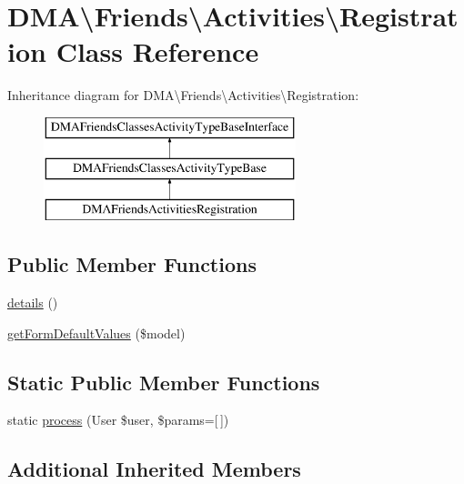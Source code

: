 \hypertarget{classDMA_1_1Friends_1_1Activities_1_1Registration}{}\section{D\+M\+A\textbackslash{}Friends\textbackslash{}Activities\textbackslash{}Registration Class Reference}
\label{classDMA_1_1Friends_1_1Activities_1_1Registration}
Inheritance diagram for D\+M\+A\textbackslash{}Friends\textbackslash{}Activities\textbackslash{}Registration\+:\begin{figure}[H]
\begin{center}
\leavevmode
\includegraphics[height=3.000000cm]{db/dcb/classDMA_1_1Friends_1_1Activities_1_1Registration}
\end{center}
\end{figure}
\subsection*{Public Member Functions}
\begin{DoxyCompactItemize}
\item 
\hyperlink{classDMA_1_1Friends_1_1Activities_1_1Registration_abe3b5a62acda2c624e0231c8c07ab6d6}{details} ()
\item 
\hyperlink{classDMA_1_1Friends_1_1Activities_1_1Registration_a3b6c1af40898032cceb29135da6cf283}{get\+Form\+Default\+Values} (\$model)
\end{DoxyCompactItemize}
\subsection*{Static Public Member Functions}
\begin{DoxyCompactItemize}
\item 
static \hyperlink{classDMA_1_1Friends_1_1Activities_1_1Registration_a19479293c2e231e6e9723f87c8a9b159}{process} (User \$user, \$params=\mbox{[}$\,$\mbox{]})
\end{DoxyCompactItemize}
\subsection*{Additional Inherited Members}


